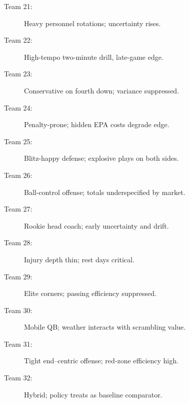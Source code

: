 \begin{description}
  \item[Team 21:] Heavy personnel rotations; uncertainty rises.
  \item[Team 22:] High-tempo two-minute drill, late-game edge.
  \item[Team 23:] Conservative on fourth down; variance suppressed.
  \item[Team 24:] Penalty-prone; hidden EPA costs degrade edge.
  \item[Team 25:] Blitz-happy defense; explosive plays on both sides.
  \item[Team 26:] Ball-control offense; totals underspecified by market.
  \item[Team 27:] Rookie head coach; early uncertainty and drift.
  \item[Team 28:] Injury depth thin; rest days critical.
  \item[Team 29:] Elite corners; passing efficiency suppressed.
  \item[Team 30:] Mobile QB; weather interacts with scrambling value.
  \item[Team 31:] Tight end–centric offense; red-zone efficiency high.
  \item[Team 32:] Hybrid; policy treats as baseline comparator.
\end{description}

%
%
%
%





% 

